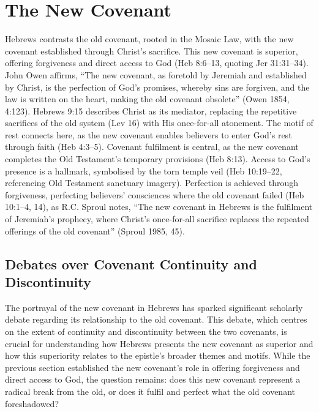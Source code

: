 \documentclass[12pt]{article}
\begin{document}
\section{The New Covenant}
Hebrews contrasts the old covenant, rooted in the Mosaic Law, with the new
covenant established through Christ’s sacrifice. This new covenant is superior,
offering forgiveness and direct access to God (Heb 8:6--13, quoting Jer
31:31--34). John Owen affirms, ``The new covenant, as foretold by Jeremiah and
established by Christ, is the perfection of God’s promises, whereby sins are
forgiven, and the law is written on the heart, making the old covenant
obsolete'' (Owen 1854, 4:123). Hebrews 9:15 describes Christ as its mediator,
replacing the repetitive sacrifices of the old system (Lev 16) with His
once-for-all atonement. The motif of rest connects here, as the new covenant
enables believers to enter God’s rest through faith (Heb 4:3--5). Covenant
fulfilment is central, as the new covenant completes the Old Testament’s
temporary provisions (Heb 8:13). Access to God’s presence is a hallmark,
symbolised by the torn temple veil (Heb 10:19--22, referencing Old Testament
sanctuary imagery). Perfection is achieved through forgiveness, perfecting
believers’ consciences where the old covenant failed (Heb 10:1--4, 14), as R.C.
Sproul notes, ``The new covenant in Hebrews is the fulfilment of Jeremiah’s
prophecy, where Christ’s once-for-all sacrifice replaces the repeated offerings
of the old covenant'' (Sproul 1985, 45).

\subsection{Debates over Covenant Continuity and Discontinuity}
The portrayal of the new covenant in Hebrews has sparked significant scholarly
debate regarding its relationship to the old covenant. This debate, which
centres on the extent of continuity and discontinuity between the two covenants,
is crucial for understanding how Hebrews presents the new covenant as superior
and how this superiority relates to the epistle’s broader themes and motifs.
While the previous section established the new covenant’s role in offering
forgiveness and direct access to God, the question remains: does this new
covenant represent a radical break from the old, or does it fulfil and perfect
what the old covenant foreshadowed?
\end{document}
